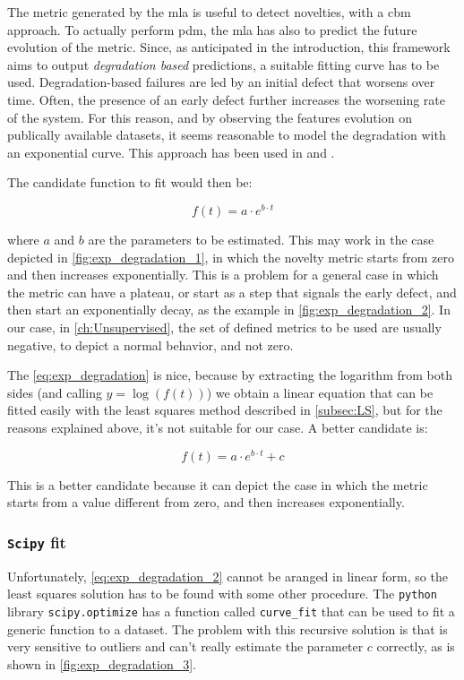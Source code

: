 The metric generated by the \gls{mla} is useful to detect novelties, with a \gls{cbm} approach. To actually perform \gls{pdm}, the \gls{mla} has also to predict the future evolution of the metric. Since, as anticipated in the introduction, this framework aims to output \emph{degradation based} predictions, a suitable fitting curve has to be used. Degradation-based failures are led by an initial defect that worsens over time. Often, the presence of an early defect further increases the worsening rate of the system. For this reason, and by observing the features evolution on publically available datasets, it seems reasonable to model the degradation with an exponential curve. This approach has been used in \cite{exp_degradation} and \cite{exp_degradation_NeuralNN}.

The candidate function to fit would then be:

\begin{equation}
    \label{eq:exp_degradation}
    f(t) = a \cdot e^{b \cdot t}
\end{equation}

where $a$ and $b$ are the parameters to be estimated. This may work in the case depicted in \autoref{fig:exp_degradation_1}, in which the novelty metric starts from zero and then increases exponentially. This is a problem for a general case in which the metric can have a plateau, or start as a step that signals the early defect, and then start an exponentially decay, as the example in \autoref{fig:exp_degradation_2}. In our case, in \autoref{ch:Unsupervised}, the set of defined metrics to be used are usually negative, to depict a normal behavior, and not zero. 

The \autoref{eq:exp_degradation} is nice, because by extracting the logarithm from both sides (and calling $y = \log(f(t))$) we obtain a linear equation that can be fitted easily with the least squares method described in \autoref{subsec:LS}, but for the reasons explained above, it's not suitable for our case. A better candidate is:

\begin{equation}
    \label{eq:exp_degradation_2}
    f(t) = a \cdot e^{b \cdot t} + c
\end{equation}

This is a better candidate because it can depict the case in which the metric starts from a value different from zero, and then increases exponentially.

\subsubsection{\texttt{Scipy} fit}
Unfortunately, \autoref{eq:exp_degradation_2} cannot be aranged in linear form, so the least squares solution has to be found with some other procedure. The \texttt{python} library \texttt{scipy.optimize} has a function called \texttt{curve\_fit} that can be used to fit a generic function to a dataset. The problem with this recursive solution is that is very sensitive to outliers and can't really estimate the parameter $c$ correctly, as is shown in \autoref{fig:exp_degradation_3}.

